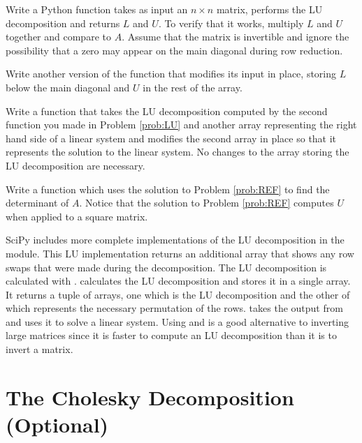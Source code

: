 \begin{problem}
\label{prob:LU}
Write a Python function takes as input an $n\times n$ matrix, performs the LU decomposition and returns $L$ and $U$.
To verify that it works, multiply $L$ and $U$ together and compare to $A$.
Assume that the matrix is invertible and ignore the possibility that a zero may appear on the main diagonal during row reduction.

Write another version of the function that modifies its input in place, storing $L$ below the main diagonal and $U$ in the rest of the array.
\end{problem}

\begin{problem}
\label{prob:lusolve}
Write a function that takes the LU decomposition computed by the second function you made in Problem \ref{prob:LU} and another array representing the right hand side of a linear system and modifies the second array in place so that it represents the solution to the linear system.
No changes to the array storing the LU decomposition are necessary.
\end{problem}

\begin{problem}
\label{prob:det}
Write a function which uses the solution to Problem \ref{prob:REF} to find the determinant of $A$.
Notice that the solution to Problem \ref{prob:REF} computes $U$ when applied to a square matrix.
\end{problem}

SciPy includes more complete implementations of the LU decomposition in the  module.
This LU implementation returns an additional array that shows any row swaps that were made during the decomposition.
The LU decomposition is calculated with .
 calculates the LU decomposition and stores it in a single array.
It returns a tuple of arrays, one which is the LU decomposition and the other of which represents the necessary permutation of the rows.
 takes the output from  and uses it to solve a linear system.
Using  and  is a good alternative to inverting large matrices since it is faster to compute an LU decomposition than it is to invert a matrix.

\section*{The Cholesky Decomposition (Optional)}

